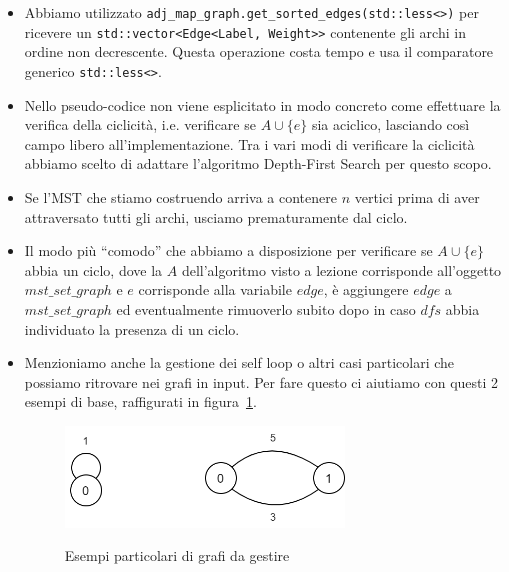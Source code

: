 \begin{itemize}
    \item Abbiamo utilizzato \texttt{adj_map_graph.get_sorted_edges(std::less<>{})} per ricevere un \texttt{std::vector<Edge<Label, Weight>>} contenente gli archi in ordine non decrescente. Questa operazione costa tempo \complexityMLogM{} e usa il comparatore generico \texttt{std::less<>}.\\

    \item Nello pseudo-codice non viene esplicitato in modo concreto come effettuare la verifica della ciclicità, i.e. verificare se $A \cup \{ e \}$ sia aciclico, lasciando così campo libero all'implementazione. Tra i vari modi di verificare la ciclicità abbiamo scelto di adattare l'algoritmo Depth-First Search per questo scopo.\\

    \item Se l'MST che stiamo costruendo arriva a contenere $n$ vertici prima di aver attraversato tutti gli archi, usciamo prematuramente dal ciclo.\\

    \item Il modo più ``comodo'' che abbiamo a disposizione per verificare se $A \cup \{ e \}$ abbia un ciclo, dove la $A$ dell'algoritmo visto a lezione corrisponde all'oggetto $mst\_set\_graph$ e $e$ corrisponde alla variabile $edge$, è aggiungere $edge$ a $mst\_set\_graph$ ed eventualmente rimuoverlo subito dopo in caso $dfs$ abbia individuato la presenza di un ciclo.\\

    \item Menzioniamo anche la gestione dei self loop o altri casi particolari che possiamo ritrovare nei grafi in input. Per fare questo ci aiutiamo con questi 2 esempi di base, raffigurati in figura~\ref{fig:SelfLoop}.

\begin{figure}[h]
	\caption{Esempi particolari di grafi da gestire}
	\centering
	\includegraphics[width=0.7\textwidth]{./images/ExampleSelfLoop.png}
	\label{fig:SelfLoop}
\end{figure}


\end{itemize}
